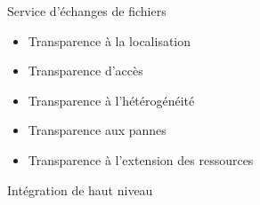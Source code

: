  Service d'échanges de fichiers \\

\begin{itemize}
	\item Transparence à la localisation
	\item Transparence d'accès
	\item Transparence à l'hétérogénéité
	\item Transparence aux pannes
	\item Transparence à l'extension des ressources
\end{itemize}

 Intégration de haut niveau
